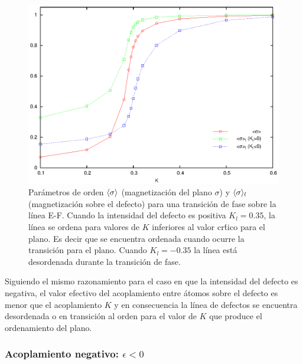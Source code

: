 \begin{figure}[h!]
\begin{center}
\includegraphics[width=\figwidth]{graf/exp/line_enhdec3_e0.75.eps}
\end{center}
\caption{Parámetros de orden $\langle \sigma \rangle$ (magnetizaci\'on del plano $\sigma$) y $\langle \sigma \rangle_{l}$ (magnetizaci\'on sobre el defecto)
 para una transici\'on de fase sobre la l\'inea E-F. Cuando la intensidad del defecto es positiva $K_{l}=0.35$, la l\'inea se ordena
 para valores de $K$ inferiores al valor cr\'tico para el plano. Es decir que se encuentra ordenada cuando ocurre la transici\'on para el plano.
 Cuando $K_{l}=-0.35$ la l\'inea est\'a desordenada durante la transici\'on de fase.}
\label{fig:line_enhdec3_e0.75}
\end{figure}

Siguiendo el mismo razonamiento para el caso en que la intensidad del defecto es negativa, el valor efectivo del acoplamiento entre \'atomos sobre
 el defecto es menor que el acoplamiento $K$ y en consecuencia la l\'inea de defectos se encuentra desordenada o en transici\'on al orden para el
 valor de $K$ que produce el ordenamiento del plano.\\

\subsubsection{Acoplamiento negativo: $\epsilon<0$}

